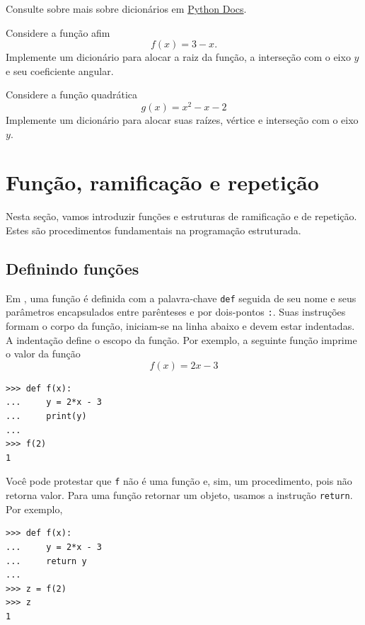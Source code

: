 \documentclass[12pt]{article}
\begin{document}
\begin{obs}
  Consulte sobre mais sobre dicionários em \href{https://docs.python.org/3/tutorial/datastructures.html#dictionaries}{Python Docs}.
\end{obs}

\begin{exr}
  Considere a função afim
  \begin{equation}
    f(x) = 3 - x.
  \end{equation}
  Implemente um dicionário para alocar a raiz da função, a interseção com o eixo $y$ e seu coeficiente angular.
\end{exr}

\begin{exr}
  Considere a função quadrática
  \begin{equation}
    g(x) = x^2 - x - 2
  \end{equation}
  Implemente um dicionário para alocar suas raízes, vértice e interseção com o eixo $y$.
\end{exr}

\section{Função, ramificação e repetição}\label{sec_fun}

Nesta seção, vamos introduzir funções e estruturas de ramificação e de repetição. Estes são procedimentos fundamentais na programação estruturada.

\subsection{Definindo funções}

Em {\python}, uma função é definida com a palavra-chave \lstinline+def+ seguida de seu nome e seus parâmetros encapsulados entre parênteses e por dois-pontos \lstinline+:+. Suas instruções formam o corpo da função, iniciam-se na linha abaixo e devem estar indentadas. A indentação define o escopo da função. Por exemplo, a seguinte função imprime o valor da função
\begin{equation}
  f(x) = 2x - 3
\end{equation}
\begin{lstlisting}
>>> def f(x):
...     y = 2*x - 3
...     print(y)
... 
>>> f(2)
1
\end{lstlisting}
Você pode protestar que \lstinline+f+ não é uma função e, sim, um procedimento, pois não retorna valor. Para uma função retornar um objeto, usamos a instrução \lstinline+return+. Por exemplo,
\begin{lstlisting}
>>> def f(x):
...     y = 2*x - 3
...     return y
... 
>>> z = f(2)
>>> z
1
\end{lstlisting}
\end{document}

